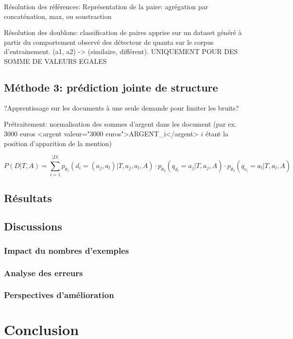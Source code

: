 Résolution des références: Représentation de la paire: agrégation par concaténation, max, ou soustraction


Résolution des doublons: classification de paires apprise sur un dataset généré à partir du comportement observé des détecteur de quanta sur le corpus d'entrainement. (a1, a2) -> (similaire, différent). UNIQUEMENT POUR DES SOMME DE VALEURS EGALES


\subsection{Méthode 3: prédiction jointe de structure}
?Apprentissage sur les documents à une seule demande pour limiter les bruits?

Prétraitement: normalisation des sommes d'argent dans les document (par ex. 3000 euros <argent valeur="3000 euros">ARGENT\_i</argent> $i$ étant la position d'apparition de la mention)

\begin{equation}
P(D|T,A) = \sum\limits_{i=1}^{\vert D \vert} p_{\theta_1}(d_i = (a_j, a_l) | T, a_j, a_l, A) \cdot p_{\theta_2}(q_{d_i} = a_j | T, a_j, A) \cdot p_{\theta_3}(q_{r_i} = a_l | T, a_l, A)    
\end{equation}

\subsection{Résultats}

\subsection{Discussions}
\subsubsection{Impact du nombres d'exemples}
\subsubsection{Analyse des erreurs}
\subsubsection{Perspectives d'amélioration}

\section{Conclusion}
\label{sec:quanta:conclusion}

